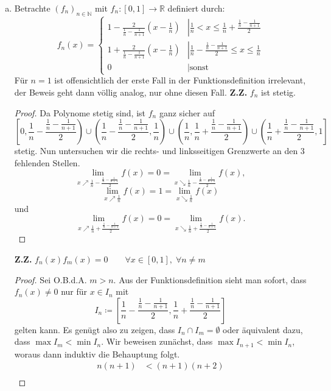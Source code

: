 \documentclass{article}
\theoremstyle{definition}
\newcommand{\N}{\mathbb{N}}
\newcommand{\R}{\mathbb{R}}
\begin{document}
\begin{enumerate}[(a)]
	\item Betrachte $(f_n)_{n\in\N}$ mit $f_n: [0,1]\longrightarrow \R $ definiert durch: 
		$$f_n(x)=\begin{cases}
			1 - \frac{2}{\frac{1}{n} - \frac{1}{n+1}}(x-\frac{1}{n}) &\left|\frac{1}{n} < x \leq \frac{1}{n} + \frac{\frac{1}{n} - \frac{1}{n+1}}{2}\right.\\
			1 + \frac{2}{\frac{1}{n} - \frac{1}{n+1}}(x-\frac{1}{n}) &\left|\frac{1}{n} - \frac{\frac{1}{n} - \frac{1}{n+1}}{2} \leq x \leq \frac{1}{n}\right.\\
			0 &\left|\text{sonst}\right.
		\end{cases} $$
		Für $n = 1$ ist offensichtlich der erste Fall in der Funktionsdefinition irrelevant, der Beweis geht dann völlig analog, nur ohne diesen Fall.
		\textbf{Z.Z.} $f_n$ ist stetig.
		\begin{proof}
			Da Polynome stetig sind, ist $f_n$ ganz sicher auf $$\left[0,\frac{1}{n} - \frac{\frac{1}{n} - \frac{1}{n+1}}{2}\right) \cup \left(\frac{1}{n} - \frac{\frac{1}{n} - \frac{1}{n+1}}{2}, \frac{1}{n}\right) \cup \left(\frac{1}{n}, \frac{1}{n} + \frac{\frac{1}{n} - \frac{1}{n+1}}{2}\right)\cup \left(\frac{1}{n} + \frac{\frac{1}{n} - \frac{1}{n+1}}{2}, 1\right]$$ stetig. Nun untersuchen wir die rechts- und linksseitigen Grenzwerte an den 3 fehlenden Stellen.
			$$\lim\limits_{x\nearrow \frac{1}{n} - \frac{\frac{1}{n} - \frac{1}{n+1}}{2}} f(x) = 0 = \lim\limits_{x\searrow \frac{1}{n} - \frac{\frac{1}{n} - \frac{1}{n+1}}{2}} f(x),$$
			$$\lim\limits_{x\nearrow \frac{1}{n}} f(x) = 1 = \lim\limits_{x\searrow \frac{1}{n}} f(x)$$ und 
			$$\lim\limits_{x\nearrow \frac{1}{n} + \frac{\frac{1}{n} - \frac{1}{n+1}}{2}} f(x) = 0 = \lim\limits_{x\searrow \frac{1}{n} + \frac{\frac{1}{n} - \frac{1}{n+1}}{2}} f(x).$$
		\end{proof}
		\textbf{Z.Z.} $f_n(x)f_m(x) = 0 \qquad \forall x\in [0,1],\; \forall n \neq m$
		\begin{proof}
			Sei O.B.d.A. $m > n$. Aus der Funktionsdefinition sieht man sofort, dass $f_n(x) \neq 0$ nur für $x\in I_n$ mit 
			$$I_n \coloneqq \left[\frac{1}{n} - \frac{\frac{1}{n} - \frac{1}{n+1}}{2}, \frac{1}{n} + \frac{\frac{1}{n} - \frac{1}{n+1}}{2}\right]$$ gelten kann. Es genügt also zu zeigen, dass $I_n \cap I_m = \emptyset$ oder äquivalent dazu, dass $\max I_m < \min I_n$. Wir beweisen zunächst, dass $\max I_{n+1} < \min I_n$, woraus dann induktiv die Behauptung folgt.
			\begin{align*}
				n(n+1) &< (n +1)(n+2)\\

\end{align*}
\end{proof}
\end{enumerate}
\end{document}
